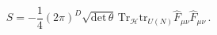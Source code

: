 \begin{equation}
 S=-\frac{1}{4}(2\pi)^D \sqrt{\mathrm{det}\,\theta}\,
 \mathrm{Tr}_{\mathcal{H}} \mathrm{tr}_{U(N)}
 \hat{F}_{\mu\nu}\hat{F}_{\mu\nu}\,.\label{eq:3.9}
\end{equation}

